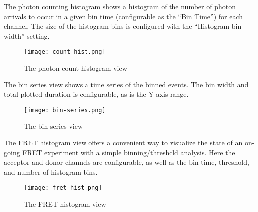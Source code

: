 The photon counting histogram shows a histogram of the number of
photon arrivals to occur in a given bin time (configurable as the
``Bin Time'') for each channel. The size of the histogram bins is
configured with the ``Histogram bin width'' setting.

\begin{figure}
  \center
  \texttt{[image: count-hist.png]}
  \caption{The photon count histogram view}
  \label{Fig:CountHist}
\end{figure}

The bin series view shows a time series of the binned events. The bin
width and total plotted duration is configurable, as is the Y axis
range.

\begin{figure}
  \center
  \texttt{[image: bin-series.png]}
  \caption{The bin series view}
  \label{Fig:BinSeries}
\end{figure}

The FRET histogram view offers a convenient way to visualize the state
of an on-going FRET experiment with a simple binning/threshold
analysis. Here the acceptor and donor channels are configurable, as
well as the bin time, threshold, and number of histogram bins.

\begin{figure}
  \center
  \texttt{[image: fret-hist.png]}
  \caption{The FRET histogram view}
  \label{Fig:FretHist}
\end{figure}

